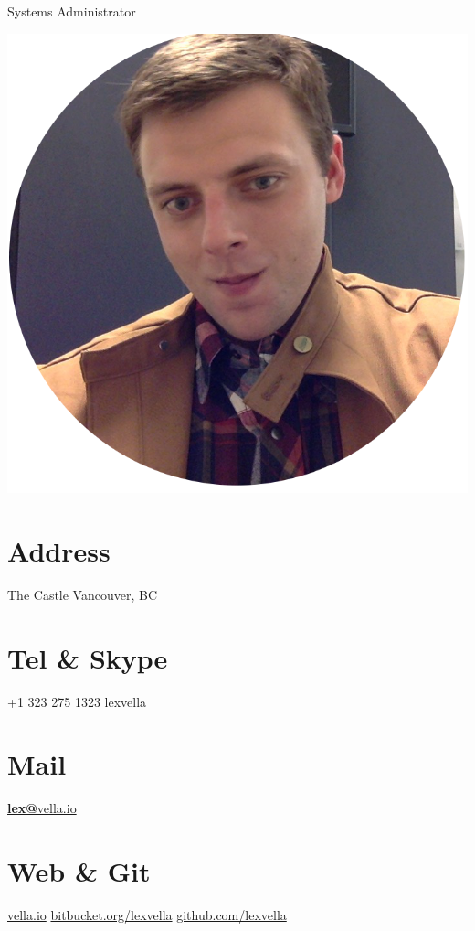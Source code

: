 \documentclass[]{vella-cv}
\begin{document}
      {Systems Administrator}
      

\begin{aside}
  \includegraphics[scale=0.15]{img/resumepic.png}
  \section{Address}
    The Castle
    Vancouver, BC
    ~
  \section{Tel \& Skype}
    +1 323 275 1323
    lexvella
    ~
  \section{Mail}
    \href{mailto:lex@vella.io}{\textbf{lex@}vella.io}
    ~
  \section{Web \& Git}
    \href{http://vella.io}{vella.io}
    \href{https://bitbucket.org/lexvella}{bitbucket.org/lexvella}
    \href{https://github.com/lexvella}{github.com/lexvella}
    ~

\end{aside}
\end{document}
